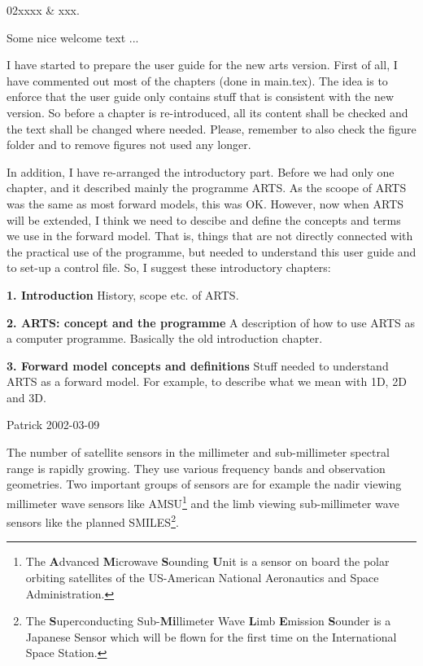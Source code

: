 %
%
 \label{sec:intro}

%
%
\starthistory
  02xxxx & xxx.\\
\stophistory


Some nice welcome text ...


I have started to prepare the user guide for the new arts version.
First of all, I have commented out most of the chapters (done in main.tex). 
The idea is to enforce that the user guide only contains stuff that is 
consistent with the new version. So before a chapter is re-introduced, all
its content shall be checked and the text shall be changed where needed.
Please, remember to also check the figure folder and to remove figures
not used any longer. 

In addition, I have re-arranged the introductory part. Before we had
only one chapter, and it described mainly the programme ARTS. As the
scoope of ARTS was the same as most forward models, this was OK.
However, now when ARTS will be extended, I think we need to descibe
and define the concepts and terms we use in the forward model. That
is, things that are not directly connected with the practical use of
the programme, but needed to understand this user guide and to set-up
a control file. So, I suggest these introductory chapters:

{\bf 1. Introduction} History, scope etc. of ARTS.

{\bf 2. ARTS: concept and the programme} A description of how to use ARTS
as a computer programme. Basically the old introduction chapter.

{\bf 3. Forward model concepts and definitions} Stuff needed to
understand ARTS as a forward model. For example, to describe what we
mean with 1D, 2D and 3D.
 

Patrick 2002-03-09


\label{sec:intro:background}

The number of satellite sensors in the millimeter and sub-millimeter
spectral range is rapidly growing. They use various frequency
bands and observation geometries. Two important groups of
sensors are for example the nadir viewing millimeter wave
sensors like AMSU\footnote{The \textbf{A}dvanced
  \textbf{M}icrowave \textbf{S}ounding \textbf{U}nit is a
  sensor on board the polar orbiting satellites of the
  US-American National Aeronautics and Space Administration.}
and the limb viewing sub-millimeter wave sensors like the
planned SMILES\footnote{The \textbf{S}uperconducting
  Sub-\textbf{Mi}llimeter Wave \textbf{L}imb \textbf{E}mission
  \textbf{S}ounder is a Japanese Sensor which will be flown
  for the first time on the International Space Station.}.

